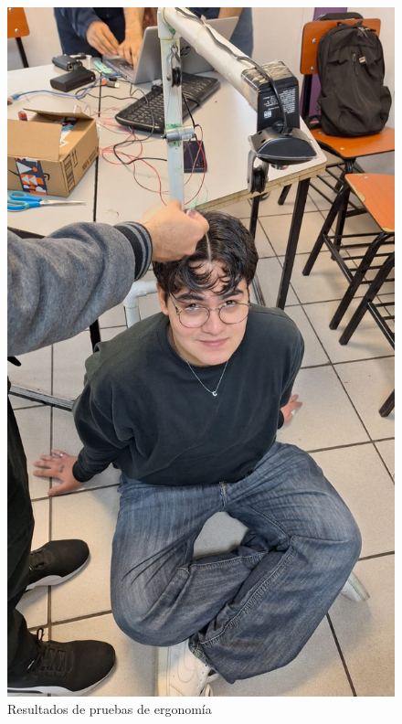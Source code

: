 \begin{figure}[H]
    \centering
    \includegraphics[width=1\textwidth, height=.9\textheight]{img/PruebaErgonomica2.png}
    \caption{Resultados de pruebas de ergonomía}
    \label{fig:ergo-test}
\end{figure}

